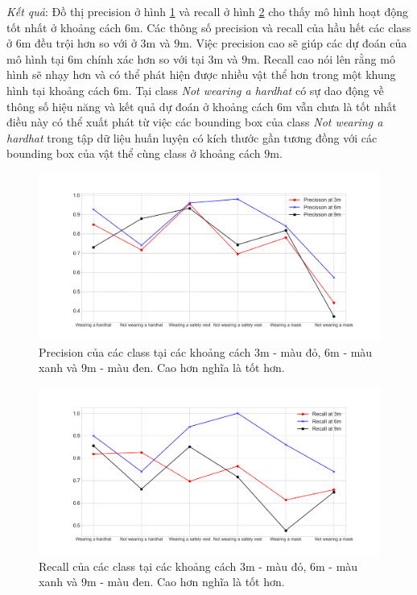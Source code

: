 \emph{Kết quả}: Đồ thị precision ở hình \ref{fig:3_6_9_precision} và recall ở hình \ref{fig:3_6_9_recall} cho thấy mô hình hoạt động tốt nhất ở khoảng cách $6$m. Các thông số precision và recall của hầu hết các class ở $6$m đều trội hơn so với ở $3$m và $9$m. Việc precision cao sẽ giúp các dự đoán của mô hình tại $6$m chính xác hơn so với tại $3$m và $9$m. Recall cao nói lên rằng mô hình sẽ nhạy hơn và có thể phát hiện được nhiều vật thể hơn trong một khung hình tại khoảng cách $6$m. Tại class \emph{Not wearing a hardhat} có sự dao động về thông số hiệu năng và kết quả dự đoán ở khoảng cách $6$m vẫn chưa là tốt nhất điều này có thể xuất phát từ việc các bounding box của class \emph{Not wearing a hardhat} trong tập dữ liệu huấn luyện có kích thước gần tương đồng với các bounding box của vật thể cùng class ở khoảng cách $9$m.
\begin{figure}[ht!]
	\centerline{\includegraphics[scale=0.5]{images/3_6_9_precision.png}}
  	\caption{Precision của các class tại các khoảng cách 3m - màu đỏ, 6m - màu xanh và 9m - màu đen. Cao hơn nghĩa là tốt hơn.}
  	\label{fig:3_6_9_precision}
\end{figure}
\begin{figure}[ht!]
	\centerline{\includegraphics[scale=0.5]{images/3_6_9_recall.png}}
  	\caption{Recall của các class tại các khoảng cách 3m - màu đỏ, 6m - màu xanh và 9m - màu đen. Cao hơn nghĩa là tốt hơn.}
  	\label{fig:3_6_9_recall}
\end{figure}

